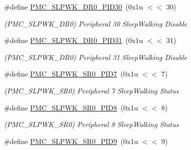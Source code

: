 \begin{DoxyCompactItemize}
\mbox{\label{group__SAMS70__PMC_gadb8361edd29501c31639b29d439a7442}} 
\#define \mbox{\hyperlink{group__SAMS70__PMC_gadb8361edd29501c31639b29d439a7442}{P\+M\+C\+\_\+\+S\+L\+P\+W\+K\+\_\+\+D\+R0\+\_\+\+P\+I\+D30}}~(0x1u $<$$<$ 30)
\begin{DoxyCompactList}\small\item\em (P\+M\+C\+\_\+\+S\+L\+P\+W\+K\+\_\+\+D\+R0) Peripheral 30 Sleep\+Walking Disable \end{DoxyCompactList}\item 
\mbox{\label{group__SAMS70__PMC_ga535a859388caa8385073eb68e7150bb7}} 
\#define \mbox{\hyperlink{group__SAMS70__PMC_ga535a859388caa8385073eb68e7150bb7}{P\+M\+C\+\_\+\+S\+L\+P\+W\+K\+\_\+\+D\+R0\+\_\+\+P\+I\+D31}}~(0x1u $<$$<$ 31)
\begin{DoxyCompactList}\small\item\em (P\+M\+C\+\_\+\+S\+L\+P\+W\+K\+\_\+\+D\+R0) Peripheral 31 Sleep\+Walking Disable \end{DoxyCompactList}\item 
\mbox{\label{group__SAMS70__PMC_ga6771914b09a260b40845efd5c09dc42b}} 
\#define \mbox{\hyperlink{group__SAMS70__PMC_ga6771914b09a260b40845efd5c09dc42b}{P\+M\+C\+\_\+\+S\+L\+P\+W\+K\+\_\+\+S\+R0\+\_\+\+P\+I\+D7}}~(0x1u $<$$<$ 7)
\begin{DoxyCompactList}\small\item\em (P\+M\+C\+\_\+\+S\+L\+P\+W\+K\+\_\+\+S\+R0) Peripheral 7 Sleep\+Walking Status \end{DoxyCompactList}\item 
\mbox{\label{group__SAMS70__PMC_gaf31c268accd1f5da86d29d6f74809f38}} 
\#define \mbox{\hyperlink{group__SAMS70__PMC_gaf31c268accd1f5da86d29d6f74809f38}{P\+M\+C\+\_\+\+S\+L\+P\+W\+K\+\_\+\+S\+R0\+\_\+\+P\+I\+D8}}~(0x1u $<$$<$ 8)
\begin{DoxyCompactList}\small\item\em (P\+M\+C\+\_\+\+S\+L\+P\+W\+K\+\_\+\+S\+R0) Peripheral 8 Sleep\+Walking Status \end{DoxyCompactList}\item 
\mbox{\label{group__SAMS70__PMC_ga39fb1a078476fd3389bf9b7b05295ba9}} 
\#define \mbox{\hyperlink{group__SAMS70__PMC_ga39fb1a078476fd3389bf9b7b05295ba9}{P\+M\+C\+\_\+\+S\+L\+P\+W\+K\+\_\+\+S\+R0\+\_\+\+P\+I\+D9}}~(0x1u $<$$<$ 9)
$$
\end{DoxyCompactItemize}
